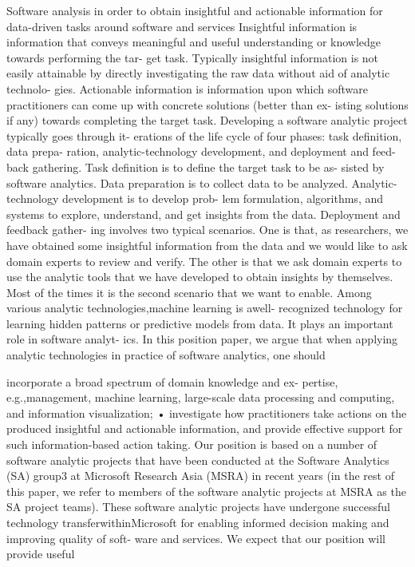 Software analysis in order to obtain insightful and actionable information for data-driven tasks around software and services Insightful information is information that conveys meaningful
and useful understanding or knowledge towards performing the tar- get task. Typically insightful information is not easily attainable by directly investigating the raw data without aid of analytic technolo- gies. Actionable information is information upon which software practitioners can come up with concrete solutions (better than ex- isting solutions if any) towards completing the target task. Developing a software analytic project typically goes through it-
erations of the life cycle of four phases: task definition, data prepa- ration, analytic-technology development, and deployment and feed- back gathering. Task definition is to define the target task to be as- sisted by software analytics. Data preparation is to collect data to be analyzed. Analytic-technology development is to develop prob- lem formulation, algorithms, and systems to explore, understand, and get insights from the data. Deployment and feedback gather- ing involves two typical scenarios. One is that, as researchers, we have obtained some insightful information from the data and we would like to ask domain experts to review and verify. The other is that we ask domain experts to use the analytic tools that we have developed to obtain insights by themselves. Most of the times it is the second scenario that we want to enable. Among various analytic technologies,machine learning is awell-
recognized technology for learning hidden patterns or predictive models from data. It plays an important role in software analyt- ics. In this position paper, we argue that when applying analytic technologies in practice of software analytics, one should

incorporate a broad spectrum of domain knowledge and ex- pertise, e.g.,management, machine learning, large-scale data processing and computing, and information visualization;
• investigate how practitioners take actions on the produced insightful and actionable information, and provide effective support for such information-based action taking.
Our position is based on a number of software analytic projects
that have been conducted at the Software Analytics (SA) group3 at Microsoft Research Asia (MSRA) in recent years (in the rest of this paper, we refer to members of the software analytic projects at MSRA as the SA project teams). These software analytic projects have undergone successful technology transferwithinMicrosoft for enabling informed decision making and improving quality of soft- ware and services. We expect that our position will provide useful
